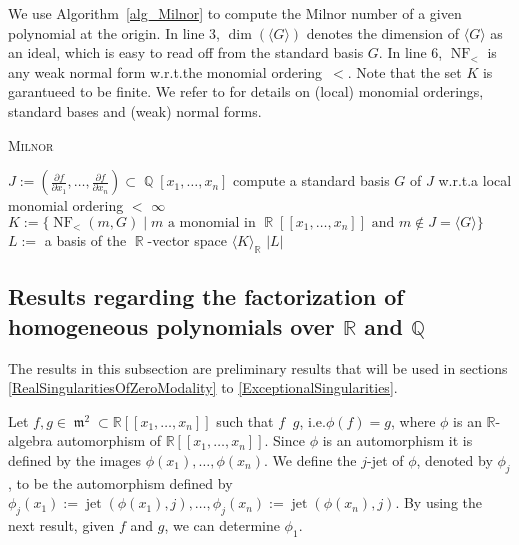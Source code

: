 \documentclass[noend]{amsproc}
\DeclareMathOperator{\requiv}{\overset{r}{\sim}}
\DeclareMathOperator{\m}{\mathfrak{m}}
\DeclareMathOperator{\jet}{jet}
\DeclareMathOperator{\NF}{NF}
\DeclareMathOperator{\Q}{\mathbb{Q}}
\DeclareMathOperator{\R}{\mathbb{R}}
\begin{document}
We use Algorithm~\ref{alg_Milnor} to compute the Milnor number of a given
polynomial at the origin. In line 3, $\dim(\langle G \rangle)$ denotes the
dimension of $\langle G \rangle$ as an ideal, which is easy to read off from
the standard basis $G$. In line 6, $\NF_<$ is any weak normal form w.r.t.\@ the
monomial ordering~$<$. Note that the set $K$ is garantueed to be finite. We
refer to \cite{GP2008} for details on (local) monomial orderings, standard
bases and (weak) normal forms.

\begin{algorithm}[h]
\caption{\label{alg_Milnor} \textsc{Milnor}}
\begin{algorithmic}[1]

\REQUIRE{$f \in \Q[x_1,\ldots,x_n]$}

\STATE $J := \left( \frac{\partial f}{\partial x_1}, \ldots,
\frac{\partial f}{\partial x_n} \right) \subset \Q[x_1,\ldots,x_n]$
\STATE compute a standard basis $G$ of $J$ w.r.t.\@ a local monomial ordering
$<$
\RETURN $\infty$
\ELSE
\STATE $K := \{\NF_<(m, G) \mid m \text{ a monomial in } \R[[x_1,\ldots,x_n]]
\text{ and } m \not\in J = \langle G \rangle \}$
\STATE $L :=$ a basis of the $\R$-vector space $\langle K \rangle_{\R}$
\RETURN $|L|$
\ENDIF

\end{algorithmic}
\end{algorithm}


\subsection{Results regarding the factorization of homogeneous polynomials
over $\mathbb R$ and $\mathbb Q$}%
\label{ResultsRegardingTheFactorizationOfHomogeneousPolynomialsOverRAndQ}

The results in this subsection are preliminary results that will be used in
sections \ref{RealSingularitiesOfZeroModality} to
\ref{ExceptionalSingularities}.

Let $f,g\in \m^2\subset\mathbb R[[x_1,\ldots,x_n]]$ such that
$f\requiv g$, i.e.\@ $\phi(f)=g$, where $\phi$ is an $\mathbb R$-algebra
automorphism of  $\mathbb R[[x_1,\ldots,x_n]]$. Since $\phi$ is an automorphism
it is defined by the images $\phi(x_1),\ldots,\phi(x_n)$. We define the $j$-jet
of $\phi$, denoted by $\phi_j$, to be the automorphism defined by
$\phi_j(x_1):=\jet(\phi(x_1),j),\ldots,\phi_j(x_n):=\jet(\phi(x_n),j)$. By
using the next result, given $f$ and $g$, we can determine $\phi_1$.
\end{document}
